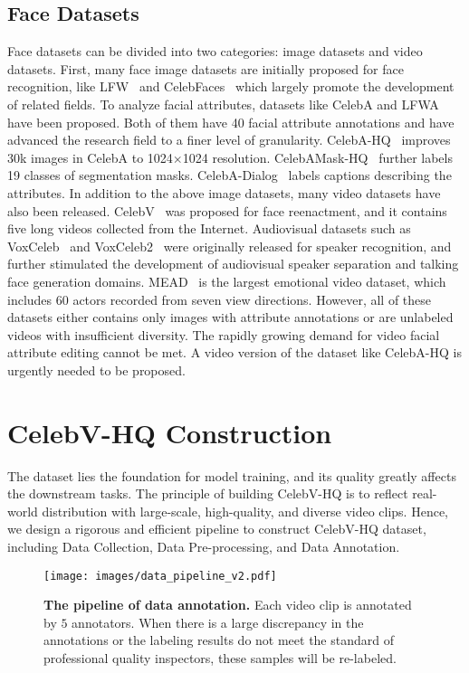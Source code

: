 \documentclass[runningheads]{llncs}
\begin{document}
\subsection{Face Datasets} 
Face datasets can be divided into two categories: image datasets and video datasets. 
First, many face image datasets are initially proposed for face recognition, like LFW~\cite{LFW} and CelebFaces~\cite{celebfaces} which largely promote the development of related fields.
To analyze facial attributes, datasets like CelebA and LFWA \cite{celeba15} have been proposed. Both of them have 40 facial attribute annotations and have advanced the research field to a finer level of granularity. CelebA-HQ~\cite{celebahq} improves 30k images in CelebA to 1024$\times$1024 resolution. CelebAMask-HQ~\cite{celebahq_mask} further labels 19 classes of segmentation masks. CelebA-Dialog~\cite{celeba_dialog} labels captions describing the attributes.  
In addition to the above image datasets, many video datasets have also been released. CelebV~\cite{wayne2018reenactgan} was proposed for face reenactment, and it contains five long videos collected from the Internet. 
Audiovisual datasets such as VoxCeleb~\cite{vox17} and VoxCeleb2~\cite{vox2} were originally released for speaker recognition, and further stimulated the development of audiovisual speaker separation and talking face generation domains. 
MEAD~\cite{mead} is the largest emotional video dataset, which includes 60 actors recorded from seven view directions.
However, all of these datasets either contains only images with attribute annotations or are unlabeled videos with insufficient diversity. The rapidly growing demand for video facial attribute editing cannot be met. A video version of the dataset like CelebA-HQ \cite{celebahq} is urgently needed to be proposed. 




\section{CelebV-HQ Construction}
The dataset lies the foundation for model training, and its quality greatly affects the downstream tasks. The principle of building CelebV-HQ is to reflect real-world distribution with large-scale, high-quality, and diverse video clips. Hence, we design a rigorous and efficient pipeline to construct CelebV-HQ dataset, including Data Collection, Data Pre-processing, and Data Annotation.


\begin{figure*}[t]
\centering
\texttt{[image: images/data\_pipeline\_v2.pdf]}\caption{\textbf{The pipeline of data annotation.} Each video clip is annotated by $5$ annotators. When there is a large discrepancy in the annotations or the labeling results do not meet the standard of professional quality inspectors, these samples will be re-labeled.}
\label{fig:data_pipeline}
\vspace{-2mm}
\end{figure*}
\end{document}
